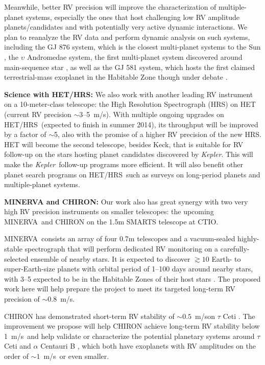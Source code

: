 \documentclass[12pt]{article}
\def\mps{m/s}
\def\kepler{{\it Kepler}}
\def\minerva{MINERVA}
\def\hrs{HET/HRS}
\begin{document}
Meanwhile, better RV precision will improve the characterization of
multiple-planet systems, especially the ones that host challenging low
RV amplitude planets/candidates and with potentially very active
dynamic interactions. We plan to reanalyze the RV data and perform
dynamic analysis on such systems, including the GJ 876 system, which
is the closest multi-planet systems to the Sun
\citep{marcy2001,rivera2005,rivera2010}, the $\upsilon$ Andromedae
system, the first multi-planet system discovered around main-sequence
star \citep{butler1999,wright2009,curiel2011}, as well as the GJ 581
system, which hosts the first claimed terrestrial-mass exoplanet in
the Habitable Zone \citep{vogt2010} though under debate
\citep[e.g.,][]{gregory2011,vogt2012,robertson2013}.

\textbf{Science with \hrs: } We also work with another leading RV
instrument on a 10-meter-class telescope: the High Resolution
Spectrograph (HRS) on HET (current RV precision $\sim$3--5~\mps). With
multiple ongoing upgrades on \hrs\ (expected to finish in summer
2014), its throughput will be improved by a factor of $\sim$5, also
with the promise of a higher RV precision of the new HRS. HET will
become the second telescope, besides Keck, that is suitable for RV
follow-up on the stars hosting planet candidates discovered by
\kepler. This will make the \kepler\ follow-up programs more
efficient. It will also benefit other planet search programs on
\hrs\ such as surveys on long-period planets and multiple-planet
systems.

\textbf{MINERVA and CHIRON: } Our work also has great synergy with two
very high RV precision instruments on smaller telescopes: the upcoming
\minerva\ and CHIRON on the 1.5m SMARTS telescope at CTIO. 

\minerva\ consists an array of four 0.7m telescopes and a
vacuum-sealed highly-stable spectrograph that will perform dedicated
RV monitoring on a carefully-selected ensemble of nearby stars. It is
expected to discover $\gtrsim 10$ Earth- to super-Earth-size planets
with orbital period of 1--100 days around nearby stars, with 3--5
expected to be in the Habitable Zones of their host stars
\citep{bottom2013,hogstrom2013}. The proposed work here will help
prepare the project to meet its targeted long-term RV precision of
$\sim 0.8$~\mps.

CHIRON has demonstrated short-term RV stability of $\sim0.5$~\mps on
$\tau$ Ceti \citep{chiron2013}. The improvement we propose will help
CHIRON achieve long-term RV stability below 1~\mps\ and help validate
or characterize the potential planetary systems around $\tau$ Ceti
\citep{tuomi2013} and $\alpha$ Centauri B
\citep{dumusque2012,hatzes2013}, which both have exoplanets with RV
amplitudes on the order of $\sim 1$~\mps\ or even smaller.
\end{document}
